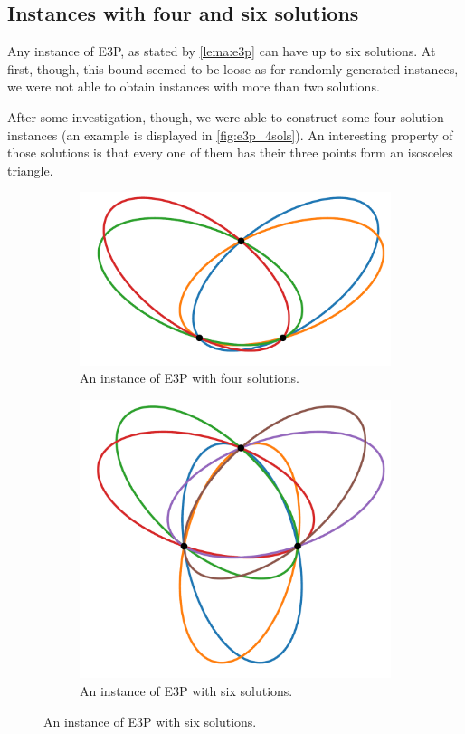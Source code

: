 \subsection{Instances with four and six solutions}

Any instance of E3P, as stated by \autoref{lema:e3p} can have up to six solutions. At first, though, this bound seemed to be loose as for randomly generated instances, we were not able to obtain instances with more than two solutions.

After some investigation, though, we were able to construct some four-solution instances (an example is displayed in \autoref{fig:e3p_4sols}). An interesting property of those solutions is that every one of them has their three points form an isosceles triangle.

\begin{figure}
	\begin{subfigure}{.5\textwidth}
		\centering
		\includegraphics[scale=.28]{../tex/figures/e3p_4sols}
		\caption{An instance of E3P with four solutions.}
		\label{fig:e3p_4sols}
	\end{subfigure}
	\begin{subfigure}{.5\textwidth}
		\centering
		\includegraphics[scale=.28]{../tex/figures/e3p_6sols}
		\caption{An instance of E3P with six solutions.}
		\label{fig:e3p_6sols}
	\end{subfigure}
\end{figure}

